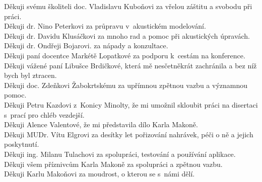 Děkuji svému školiteli doc. Vladislavu Kuboňovi za vřelou záštitu a svobodu při
práci.\\
Děkuji dr. Nino Peterkovi za průpravu v~akustickém modelování.\\
Děkuji dr. Davidu Klusáčkovi za mnoho rad a pomoc při akustických úpravách.\\
Děkuji dr. Ondřeji Bojarovi. za nápady a konzultace.\\
Děkuji paní docentce Markétě Lopatkové za podporu k~cestám na konference.\\
Děkuji vážené paní Libušce Brdičkové, která mě nesčetněkrát zachránila a bez níž
bych byl ztracen.\\
Děkuji doc. Zdeňkovi Žabokrtskému za upřímnou zpětnou vazbu a významnou pomoc.\\
Děkuji Petru Kazdovi z~Konicy Minolty, že mi umožnil skloubit práci na disertaci
s~prací pro chléb vezdejší.\\
Děkuji Alence Valentové, že mi představila dílo Karla Makoně.\\
Děkuji MUDr. Vítu Elgrovi za desítky let pořizování nahrávek, péči o ně a jejich
poskytnutí.\\
Děkuji ing. Milanu Tulachovi za spolupráci, testování a používání aplikace.\\
Děkuji všem příznivcům Karla Makoně za spolupráci a zpětnou vazbu.\\
Děkuji Karlu Makoňovi za moudrost, o kterou se s~námi dělí.
